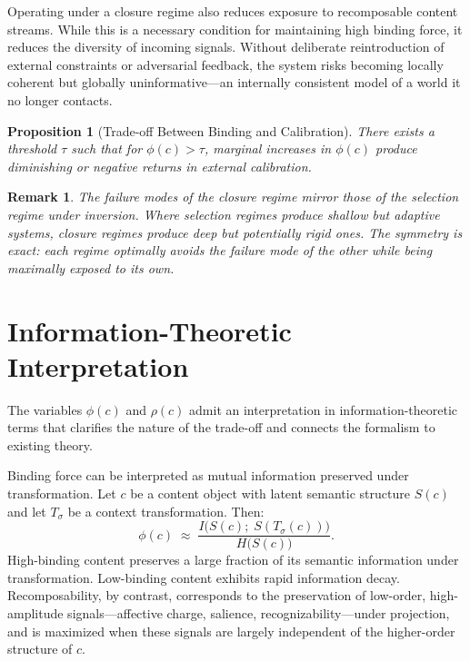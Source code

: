 \documentclass[12pt]{article}
\newtheorem{proposition}{Proposition}[section]
\newtheorem{remark}{Remark}[section]
\newcommand{\bind}{\phi}
\newcommand{\recomp}{\rho}
\begin{document}
Operating under a closure regime also reduces exposure to recomposable
content streams. While this is a necessary condition for maintaining
high binding force, it reduces the diversity of incoming signals.
Without deliberate reintroduction of external constraints or adversarial
feedback, the system risks becoming locally coherent but globally
uninformative---an internally consistent model of a world it no longer
contacts.

\begin{proposition}[Trade-off Between Binding and Calibration]
\label{prop:calibration}
There exists a threshold $\tau$ such that for $\bind(c) > \tau$,
marginal increases in $\bind(c)$ produce diminishing or negative returns
in external calibration.
\end{proposition}

\begin{remark}
The failure modes of the closure regime mirror those of the selection
regime under inversion. Where selection regimes produce shallow but
adaptive systems, closure regimes produce deep but potentially rigid
ones. The symmetry is exact: each regime optimally avoids the failure
mode of the other while being maximally exposed to its own.
\end{remark}

\section{Information-Theoretic Interpretation}
\label{sec:info}

The variables $\bind(c)$ and $\recomp(c)$ admit an interpretation in
information-theoretic terms that clarifies the nature of the trade-off
and connects the formalism to existing theory.

Binding force can be interpreted as mutual information preserved under
transformation. Let $c$ be a content object with latent semantic
structure $S(c)$ and let $T_\sigma$ be a context transformation. Then:
\[
\bind(c) \;\approx\; \frac{I\bigl(S(c);\; S(T_\sigma(c))\bigr)}{H\bigl(S(c)\bigr)}.
\]
High-binding content preserves a large fraction of its semantic
information under transformation. Low-binding content exhibits rapid
information decay. Recomposability, by contrast, corresponds to the
preservation of low-order, high-amplitude signals---affective charge,
salience, recognizability---under projection, and is maximized when
these signals are largely independent of the higher-order structure of
$c$.
\end{document}
